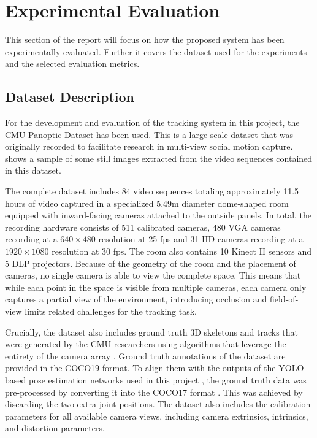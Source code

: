 \section{Experimental Evaluation} \label{experiments}

This section of the report will focus on how the proposed system has been experimentally evaluated. Further it covers the dataset used for the experiments and the selected evaluation metrics.


\subsection{Dataset Description} \label{dataset-desc}

For the development and evaluation of the tracking system in this project, the CMU Panoptic Dataset \parencite{Joo_2015_ICCV,Joo_2017_TPAMI,Simon_2017_CVPR} has been used. This is a large-scale dataset that was originally recorded to facilitate research in multi-view social motion capture.  shows a sample of some still images extracted from the video sequences contained in this dataset.

The complete dataset includes 84 video sequences totaling approximately 11.5 hours of video captured in a specialized 5.49m diameter dome-shaped room equipped with inward-facing cameras attached to the outside panels. In total, the recording hardware consists of 511 calibrated cameras, 480 VGA cameras recording at a $640 \times 480$ resolution at 25 fps and 31 HD cameras recording at a $1920 \times 1080$ resolution at 30 fps. The room also contains 10 Kinect II \parencite{kurillo2022evaluating} sensors and 5 DLP projectors. Because of the geometry of the room and the placement of cameras, no single camera is able to view the complete space. This means that while each point in the space is visible from multiple cameras, each camera only captures a partial view of the environment, introducing occlusion and field-of-view limits related challenges for the tracking task.

Crucially, the dataset also includes ground truth 3D skeletons and tracks that were generated by the CMU researchers using algorithms that leverage the entirety of the camera array \parencite{Joo_2015_ICCV}. Ground truth annotations of the dataset are provided in the COCO19 format. To align them with the outputs of the YOLO-based pose estimation networks used in this project \parencite{ultralyticsYOLO}, the ground truth data was pre-processed by converting it into the COCO17 format \parencite{lin2014microsoft}. This was achieved by discarding the two extra joint positions. The dataset also includes the calibration parameters for all available camera views, including camera extrinsics, intrinsics, and distortion parameters.

